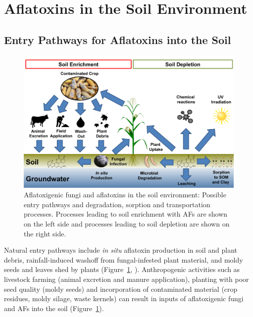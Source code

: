 \section{Aflatoxins in the Soil Environment} \label{subchap:aflatoxins_in_soil}

\subsection{Entry Pathways for Aflatoxins into the Soil} \label{subchap:entry}

\begin{figure}[b!]
	\centering
	\includegraphics[width=1\textwidth,center]{figures/aflatoxin_pathways.pdf}
	\decoRule
	\captionsetup{labelfont=bf, justification=justified, singlelinecheck=false, width=1\textwidth}
	\caption{Aflatoxigenic fungi and aflatoxins in the soil environment: Possible entry pathways and degradation, sorption and transportation processes. Processes leading to soil enrichment with AFs are shown on the left side and processes leading to soil depletion are shown on the right side.}
	\label{fig:Aflatoxin_pathways}
\end{figure}

Natural entry pathways include \textit{in situ} aflatoxin production in soil and plant debris, rainfall-induced washoff from fungal-infested plant material, and moldy seeds and leaves shed by plants (Figure~\ref{fig:Aflatoxin_pathways}, \cite{elmholt2008mycotoxins, juraschek2022mycotoxins, fouche2020aflatoxins}). Anthropogenic activities such as livestock farming (animal excretion and manure application), planting with poor seed quality (moldy seeds) and incorporation of contaminated material (crop residues, moldy silage, waste kernels) can result in inputs of aflatoxigenic fungi and AFs into the soil  (Figure~\ref{fig:Aflatoxin_pathways}).  


